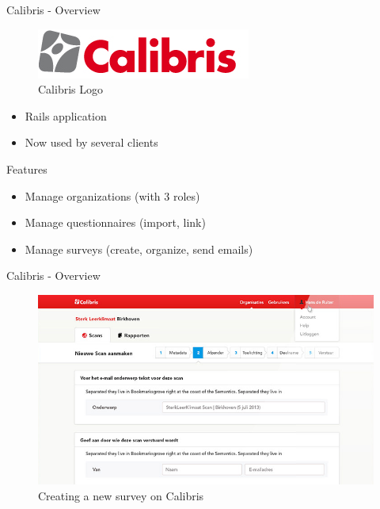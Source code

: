 \documentclass[10pt,a4paper]{beamer}
\begin{document}
\begin{frame}{Calibris - Overview}

  \begin{figure}[htp]
  \centering
  \includegraphics[scale=.50]{../img/calibris.jpg}
   \caption{Calibris Logo}
  \end{figure}
  
  \begin{itemize}
    \item Rails application
    \item Now used by several clients
  \end{itemize}

  \begin{block}{Features}
    \begin{itemize}
      \item Manage organizations (with 3 roles)
      \item Manage questionnaires (import, link)
      \item Manage surveys (create, organize, send emails)
    \end{itemize}
  \end{block}
\end{frame}

\begin{frame}{Calibris - Overview}
  \begin{figure}[htp]
  \centering
  \includegraphics[scale=0.4]{../img/calibris1.png}
   \caption{Creating a new survey on Calibris}
   \label{fig.calibris1}
  \end{figure}
\end{frame}
  
\end{document}
